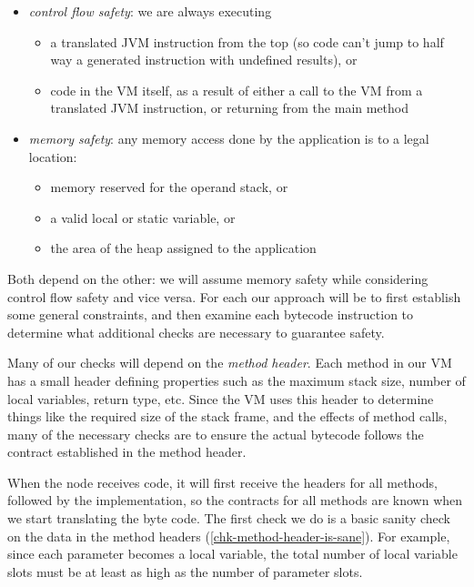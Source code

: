 \begin{itemize}
	\item \emph{control flow safety}: we are always executing
		\begin{itemize}
			\item a translated JVM instruction from the top (so code can't jump to half way a generated instruction with undefined results), or
			\item code in the VM itself, as a result of either a call to the VM from a translated JVM instruction, or returning from the main method
		\end{itemize}
	\item \emph{memory safety}: any memory access done by the application is to a legal location:
		\begin{itemize}
			\item memory reserved for the operand stack, or
			\item a valid local or static variable, or
			\item the area of the heap assigned to the application
		\end{itemize}
\end{itemize}

Both depend on the other: we will assume memory safety while considering control flow safety and vice versa. For each our approach will be to first establish some general constraints, and then examine each bytecode instruction to determine what additional checks are necessary to guarantee safety.

Many of our checks will depend on the \emph{method header}. Each method in our VM has a small header defining properties such as the maximum stack size, number of local variables, return type, etc. Since the VM uses this header to determine things like the required size of the stack frame, and the effects of method calls, many of the necessary checks are to ensure the actual bytecode follows the contract established in the method header.

When the node receives code, it will first receive the headers for all methods, followed by the implementation, so the contracts for all methods are known when we start translating the byte code. The first check we do is a basic sanity check on the data in the method headers (\ref{chk-method-header-is-sane}). For example, since each parameter becomes a local variable, the total number of local variable slots must be at least as high as the number of parameter slots.



